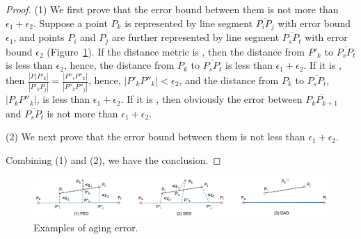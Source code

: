 \begin{proof}
	(1) We first prove that the error bound between them is not more than $\epsilon_1+ \epsilon_2$. Suppose a point $P_k$ is represented by line segment $\overline{P_iP_j}$ with error bound $\epsilon_1$, and points $P_i$ and $P_j$ are further represented by line segment $\overline{P_sP_t}$ with error bound $\epsilon_2$ (Figure~\ref{fig:aging-error}).
	If the distance metric is \ped, then the distance from $P'_k$ to $\overline{P_sP_t}$ is less than $\epsilon_2$, hence, the distance from $P_k$ to $\overline{P_sP_t}$ is less than $\epsilon_1 + \epsilon_2$.
	If it is \sed, then $\frac{|P_iP'_k|}{|P'_kP_j|} = \frac{|P''_iP''_k|}{|P''_kP''_j|}$, hence, $|P'_kP''_k|<\epsilon_2$, and the distance from $P_k$ to $\overline{P_sP_t}$, \ie $|P_kP''_k|$, is less than $\epsilon_1 + \epsilon_2$.
	If it is \dad, then obviously the error between $\overline{P_kP_{k+1}}$ and $\overline{P_sP_t}$ is not more than $\epsilon_1+ \epsilon_2$.
	
	(2) We next prove that the  error bound between them is not less than $\epsilon_1+ \epsilon_2$.
	
	Combining (1) and (2), we have the conclusion.
\end{proof}

\begin{figure}[tb!]
	\centering
	\includegraphics[scale=0.6]{Figures/Fig-aging-error.png}
	
	\caption{\small Examples of aging error.}
	\vspace{-2ex}
	\label{fig:aging-error}
\end{figure}